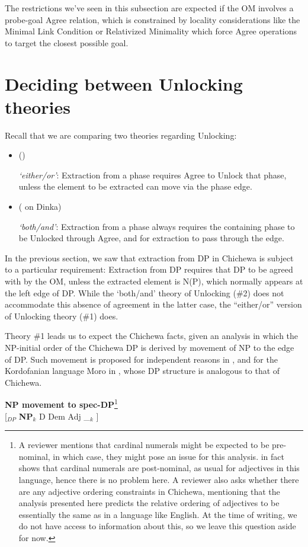\documentclass[output=paper,colorlinks,citecolor=brown]{langscibook}
\begin{document}
The restrictions we've seen in this subsection are expected if the OM involves a probe-goal Agree relation, which is constrained by locality considerations like the Minimal Link Condition \citep{Chomsky1995, Chomsky2000} or Relativized Minimality \citep{Rizzi1990} which force Agree operations to target the closest possible goal.

\section{Deciding between Unlocking theories}\label{sec:branan:4}

 Recall that we are comparing two theories regarding Unlocking:

\begin{itemize}
	\item[\#1] (\citealt{RackowskiRichards2005, Halpert2016, Halpert2019, Branan2018})

    \textit{`either/or'}: Extraction from a phase requires Agree to Unlock that phase, unless the element to be extracted can move via the phase edge.

    \item[\#2] (\citealt{VanUrkRichards2015} on Dinka)

    \textit{`both/and'}:      Extraction from a phase always requires the containing phase to be Unlocked through Agree, and for extraction to pass through the edge.

\end{itemize}

In the previous section, we saw that extraction from DP in Chichewa is subject to a particular requirement: Extraction from DP requires that DP to be agreed with by the OM, unless the extracted element is N(P), which normally appears at the left edge of DP. While the `both/and' theory of Unlocking (\#2) does not accommodate this absence of agreement in the latter case, the ``either/or'' version of Unlocking theory (\#1) does.

Theory \#1 leads us to expect the Chichewa facts, given an analysis in which the NP-initial order of the Chichewa DP is derived by movement of NP to the edge of DP. Such movement is proposed for independent reasons in \citet{Cinque2005}, and for the Kordofanian language Moro in \citet{Jenks2010}, whose DP structure is analogous to that of Chichewa.

\ea%
    \label{ex:branan:17}
    \textbf{NP movement to spec-DP}\footnote{A reviewer mentions that cardinal numerals might be expected to be pre-nominal, in which case, they might pose an issue for this analysis. \citet{Mchombo2004} in fact shows that cardinal numerals are post-nominal, as usual for adjectives in this language, hence there is no problem here. A reviewer also asks whether there are any adjective ordering constraints in Chichewa, mentioning that the analysis presented here predicts the relative ordering of adjectives to be essentially the same as in a language like English. At the time of writing, we do not have access to information about this, so we leave this question aside for now.}\\
    {[$_{DP}$} \textbf{NP}$_{k}$ D Dem Adj \_$_{k}$ ]
\z
\end{document}
